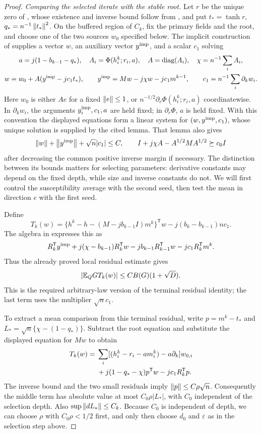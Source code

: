 \begin{proof}
\emph{Comparing the selected iterate with the stable root.}
Let $r$ be the unique zero of , whose existence
and inverse bound follow from \cite[Lemma~5.7]{SKGap}, and put
$t_* =\tanh r$, $q_*=n^{-1}\left\lVert t_*\right\rVert^2$.  On the buffered region of
$C_k$, fix the primary fields and the root, and choose one of the two
sources $w_0$ specified below. The implicit construction of
\cite[Lemma~6.3]{SKGap} supplies a vector $w$, an auxiliary vector
$y^{\rm imp}$, and a scalar $c_1$ solving
\[
 \begin{gathered}
 a=j(1-b_{k-1}-q_*),\quad A_i=\Phi(h_i^k;r_i,a),\quad
 A=\operatorname{diag}(A_i),\quad \chi=n^{-1}\sum_iA_i,\\
 w=w_0+A(y^{\rm imp}-jc_1t_*),\qquad
 y^{\rm imp}=Mw-j\chi w-jc_1m^{k-1},\qquad
 c_1=n^{-1}\sum_i\partial_k w_i.
 \end{gathered}
\]
Here $w_0$ is either $Ae$ for a fixed $\left\lVert e\right\rVert\le1$, or
$n^{-1/2}\partial_r\Phi(h_i^k;r_i,a)$ coordinatewise. In
$\partial_k w_i$, the arguments $y_i^{\rm imp},c_1,a$ are held fixed;
in $\partial_r\Phi$, $a$ is held fixed. With this convention the displayed
equations form a linear system for $(w,y^{\rm imp},c_1)$, whose unique
solution is supplied by the cited lemma. That lemma also gives
\[
 \left\lVert w\right\rVert+\left\lVert y^{\rm imp}\right\rVert+\sqrt n|c_1|\le C,\qquad
 I+j\chi A-A^{1/2}MA^{1/2}\succeq c_0I
\]
after decreasing the common positive inverse margin if necessary.
The distinction between its bounds matters for selecting parameters:
derivative constants may depend on the fixed depth, while size and
inverse constants do not.  We will first control the susceptibility
average with the second seed, then test the mean in direction $e$ with
the first seed.

Define
\[
 T_k(w)=\{h^k-h-(M-jb_{k-1}I)m^k\}^{\mathsf T}w
                 -j(b_k-b_{k-1})nc_1.
\]
The algebra in \cite[Lemma~6.6]{SKGap} expresses this as
\[
 R_k^{\mathsf T}y^{\rm imp}
 +j(\chi-b_{k-1})R_k^{\mathsf T}w
 -jb_{k-1}R_{k-1}^{\mathsf T}w-jc_1R_k^{\mathsf T}m^k.
\]
Thus the already proved local residual estimate gives
\begin{equation}\label{eq:stat-Q-terminal}
 |\mathbb E_Q G T_k(w)|\le CB(G)(1+\sqrt D).
\end{equation}
This is the required arbitrary-law version of the terminal residual
identity; the last term uses the multiplier $\sqrt n c_1$.

To extract a mean comparison from this terminal residual, write
$p=m^k-t_*$ and $L_* =\sqrt n\{\chi-(1-q_*)\}$.  Subtract the
root equation and substitute the displayed equation for $Mw$ to obtain
\begin{align}
 T_k(w)={}&\sum_i[(h_i^k-r_i-am_i^k)-a\partial_k]w_{0,i}\notag\\
 &+j(1-q_*-\chi)p^{\mathsf T}w-jc_1R_k^{\mathsf T}p.
 \label{eq:stat-implicit-comparison}
\end{align}
The inverse bound and the two small residuals imply
$\left\lVert p\right\rVert\le C\rho\sqrt n$.  Consequently the middle term has absolute
value at most $C_0\rho|L_*|$, with $C_0$ independent of the selection
depth.  Also $\sup\left\lVert dL_*\right\rVert\le C_k$.
Because $C_0$ is independent of depth, we can choose $\rho$ with
$C_0\rho<1/2$ first, and only then choose $d_0$ and $\varepsilon$ as in
the selection step above.


\end{proof}
